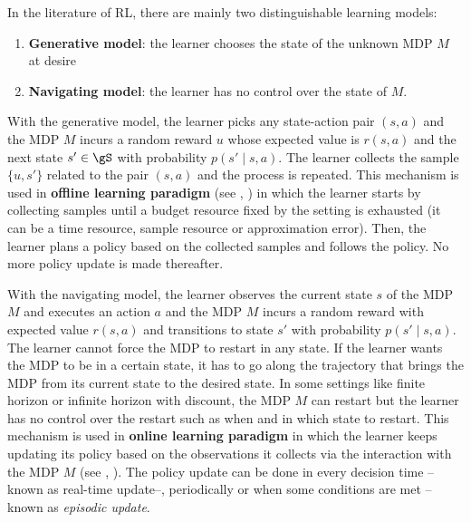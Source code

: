
In the literature of RL, there are mainly two distinguishable learning models:
\begin{enumerate}[label=(\roman*)]
    \item \textbf{Generative model}: the learner chooses the state of the unknown MDP $M$ at desire
    \item \textbf{Navigating model}: the learner has no control over the state of $M$.
\end{enumerate}
With the generative model, the learner picks any state-action pair $(s,a)$ and the MDP $M$ incurs a random reward $u$ whose expected value is $r(s,a)$ and the next state $s'\in\gS$ with probability $p(s'\mid s,a)$.
The learner collects the sample $\{u,s'\}$ related to the pair $(s,a)$ and the process is repeated.
This mechanism is used in \textbf{offline learning paradigm} (see  \eg, \cite{lange2012batch, levine2020offline}) in which the learner starts by collecting samples until a budget resource fixed by the setting is exhausted (it can be a time resource, sample resource or approximation error). Then, the learner plans a policy based on the collected samples and follows the policy.
No more policy update is made thereafter.

With the navigating model, the learner observes the current state $s$ of the MDP $M$ and executes an action $a$ and the MDP $M$ incurs a random reward with expected value $r(s,a)$ and transitions to state $s'$ with probability $p(s'\mid s,a)$.
The learner cannot force the MDP to restart in any state.
If the learner wants the MDP to be in a certain state, it has to go along the trajectory that brings the MDP from its current state to the desired state.
In some settings like finite horizon or infinite horizon with discount, the MDP $M$ can restart but the learner has no control over the restart such as when and in which state to restart.
This mechanism is used in \textbf{online learning paradigm} in which the learner keeps updating its policy based on the observations it collects via the interaction with the MDP $M$ (see \eg, \cite{jaksch2010near, osband2013more, azar2017minimax, ouyang2017learning,zanette2019tighter}).
The policy update can be done in every decision time --known as real-time update--, periodically or when some conditions are met --known as \emph{episodic update}.

